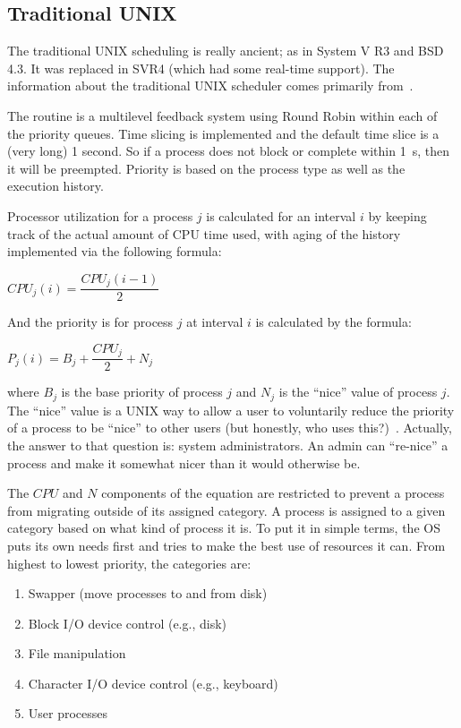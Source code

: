 \subsection*{Traditional UNIX}

The traditional UNIX scheduling is really ancient; as in System V R3 and BSD 4.3. It was replaced in SVR4 (which had some real-time support). The information about the traditional UNIX scheduler comes primarily from~\cite{osi}.

The routine is a multilevel feedback system using Round Robin within each of the priority queues. Time slicing is implemented and the default time slice is a (very long) 1 second. So if a process does not block or complete within 1~s, then it will be preempted. Priority is based on the process type as well as the execution history.

Processor utilization for a process $j$ is calculated for an interval $i$ by keeping track of the actual amount of CPU time used, with aging of the history implemented via the following formula:

\begin{center}
$CPU_{j}(i) = \dfrac{CPU_{j}(i - 1)}{2}$
\end{center}

And the priority is for process $j$ at interval $i$ is calculated by the formula:

\begin{center}
$P_{j}(i) = B_{j} + \dfrac{CPU_{j}}{2} + N_{j}$
\end{center}

where $B_{j}$ is the base priority of process $j$ and $N_{j}$ is the ``nice'' value of process $j$. The ``nice'' value is a UNIX way to allow a user to voluntarily reduce the priority of a process to be ``nice'' to other users (but honestly, who uses this?)~\cite{mos}. Actually, the answer to that question is: system administrators. An admin can ``re-nice'' a process and make it somewhat nicer than it would otherwise be.

The $CPU$ and $N$ components of the equation are restricted to prevent a process from migrating outside of its assigned category. A process is assigned to a given category based on what kind of process it is. To put it in simple terms, the OS puts its own needs first and tries to make the best use of resources it can. From highest to lowest priority, the categories are:

\begin{enumerate}
	\item Swapper (move processes to and from disk)
	\item Block I/O device control (e.g., disk)
	\item File manipulation
	\item Character I/O device control (e.g., keyboard)
	\item User processes
\end{enumerate}

